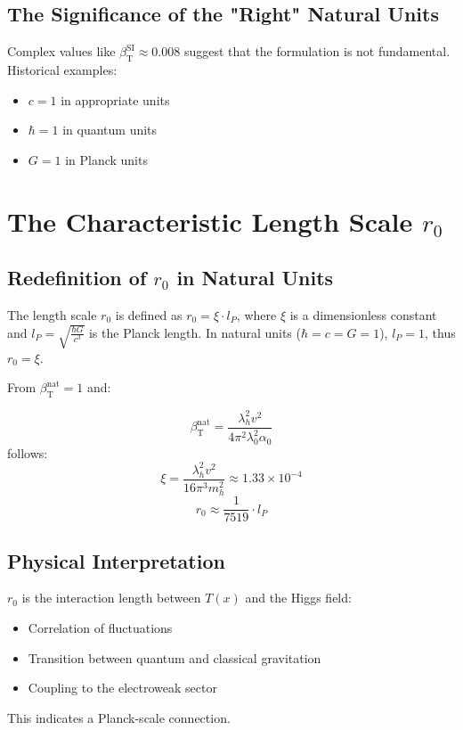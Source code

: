 ﻿\documentclass[12pt,a4paper]{article}
\newcommand{\Tfield}{T(x)}
\newcommand{\betaT}{\beta_{\text{T}}}
\begin{document}
	\subsection{The Significance of the "Right" Natural Units}
	
	Complex values like \(\betaT^{\text{SI}} \approx 0.008\) suggest that the formulation is not fundamental. Historical examples:
	\begin{itemize}
		\item \(c = 1\) in appropriate units
		\item \(\hbar = 1\) in quantum units
		\item \(G = 1\) in Planck units
	\end{itemize}
	
	\section{The Characteristic Length Scale \(r_0\)}
	
	\subsection{Redefinition of \(r_0\) in Natural Units}
	
	The length scale \(r_0\) is defined as \(r_0 = \xi \cdot l_P\), where \(\xi\) is a dimensionless constant and \(l_P = \sqrt{\frac{\hbar G}{c^3}}\) is the Planck length. In natural units (\(\hbar = c = G = 1\)), \(l_P = 1\), thus \(r_0 = \xi\).
	
	From \(\betaT^{\text{nat}} = 1\) and:
	
	
	\begin{equation}
		\betaT^{\text{nat}} = \frac{\lambda_h^2 v^2}{4\pi^2 \lambda_0^2 \alpha_0}
	\end{equation}
	follows:
	\begin{equation}
		\xi = \frac{\lambda_h^2 v^2}{16\pi^3 m_h^2} \approx 1.33 \times 10^{-4}
	\end{equation}
	\begin{equation}
		r_0 \approx \frac{1}{7519} \cdot l_P
	\end{equation}
	
	\subsection{Physical Interpretation}
	
	\(r_0\) is the interaction length between \(\Tfield\) and the Higgs field:
	\begin{itemize}
		\item Correlation of fluctuations
		\item Transition between quantum and classical gravitation
		\item Coupling to the electroweak sector
	\end{itemize}
	This indicates a Planck-scale connection.
	
\end{document}
